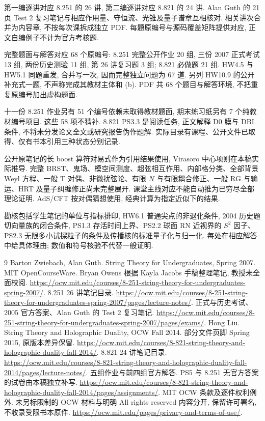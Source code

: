 第一编逐讲对应 8.251 的 26 讲, 第二编逐讲对应 8.821 的 24 讲. Alan Guth 的 21 页 Test 2 复习笔记与相应作用量、守恒流、光锥及量子谱章互相核对. 相关讲次合并为内容章, 不按每次课拆成独立 PDF. 每题原编号与源码覆盖矩阵提供对应, 正文自编例子不计为官方考核题.

完整题面与解答对应 68 个原编号: 8.251 完整公开作业 20 组, 三份 2007 正式考试 13 组, 两份历史测验 11 组, 第 26 讲复习题 3 组; 8.821 必做题 21 组. HW4.5 与 HW5.1 同题重发, 合并写一次, 因而完整独立问题为 67 道. 另列 HW10.9 的公开补充式一题, 不声称完成其教材主体和 (b). PDF 共 68 个题目与解答环境, 不把重复原编号加出虚构题面.

十一份 8.251 作业另有 51 个编号依赖未取得教材题面, 期末练习纸另有 7 个纯教材编号项目. 这些 58 项不猜补. 8.821 PS3.3 是阅读任务, 正文解释 D0 膜与 DBI 条件, 不将未分发论文全文或研究报告伪作题解. 实际目录有课程、公开文件已取得、仅有书本引用三种状态分别记录.

公开原笔记的长 boost 算符对易式作为引用结果使用, Virasoro 中心项则在本稿实际推导. 完整 BRST、鬼场、模空间测度、超弦相互作用、内部格分类、全部背景 Weyl 方程、一般 T 对偶、非微扰弦论、有限 $N$ 与有限耦合修正、一般 RG 与输运、HRT 及量子纠缠修正尚未完整展开. 课堂主线对应不能自动推为已穷尽全部理论证明. AdS/CFT 按对偶猜想使用, 经典计算为指定近似下的结果.

勘核包括学生笔记的单位与指标排印, HW6.1 普通尖点的非退化条件, 2004 历史题切向量族的闭合条件, PS1.3 存活时间上界、PS2.2 球面 RN 近视界的 $S^2$ 因子、PS2.3 无限多小试探粒子的条件及传播核的标准量子化与归一化. 每处在相应解答中给具体理由; 数值和符号核验不代替一般证明.

\begin{thebibliography}{9}
 Barton Zwiebach, Alan Guth. String Theory for Undergraduates, Spring 2007. MIT OpenCourseWare. Bryan Owens 根据 Kayla Jacobs 手稿整理笔记, 教授未全面校阅. \url{https://ocw.mit.edu/courses/8-251-string-theory-for-undergraduates-spring-2007/}.
 8.251 26 讲笔记目录. \url{https://ocw.mit.edu/courses/8-251-string-theory-for-undergraduates-spring-2007/pages/lecture-notes/}.
 正式与历史考试、2005 官方答案、Alan Guth 的 Test 2 复习笔记. \url{https://ocw.mit.edu/courses/8-251-string-theory-for-undergraduates-spring-2007/pages/exams/}.
 Hong Liu. String Theory and Holographic Duality, OCW Fall 2014. 部分文件页脚 Spring 2015, 原版本差异保留. \url{https://ocw.mit.edu/courses/8-821-string-theory-and-holographic-duality-fall-2014/}.
 8.821 24 讲笔记目录. \url{https://ocw.mit.edu/courses/8-821-string-theory-and-holographic-duality-fall-2014/pages/lecture-notes/}.
 五组作业与前四组官方解答. PS5 与 8.251 无官方答案的试卷由本稿独立补写. \url{https://ocw.mit.edu/courses/8-821-string-theory-and-holographic-duality-fall-2014/pages/assignments/}.
 MIT OCW 条款及逐件权利例外. 未另标限制的 OCW 材料与明确 All rights reserved 内容分开, 保留许可署名, 不收录受限书本原件. \url{https://ocw.mit.edu/pages/privacy-and-terms-of-use/}.
\end{thebibliography}
